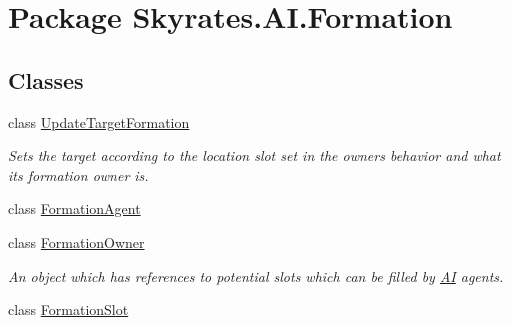 \hypertarget{namespace_skyrates_1_1_a_i_1_1_formation}{\section{Package Skyrates.\-A\-I.\-Formation}
\label{namespace_skyrates_1_1_a_i_1_1_formation}
}
\subsection*{Classes}
\begin{DoxyCompactItemize}
\item 
class \hyperlink{class_skyrates_1_1_a_i_1_1_formation_1_1_update_target_formation}{Update\-Target\-Formation}
\begin{DoxyCompactList}\small\item\em Sets the target according to the location slot set in the owners behavior and what its formation owner is. \end{DoxyCompactList}\item 
class \hyperlink{class_skyrates_1_1_a_i_1_1_formation_1_1_formation_agent}{Formation\-Agent}
\item 
class \hyperlink{class_skyrates_1_1_a_i_1_1_formation_1_1_formation_owner}{Formation\-Owner}
\begin{DoxyCompactList}\small\item\em An object which has references to potential slots which can be filled by \hyperlink{namespace_skyrates_1_1_a_i}{A\-I} agents. \end{DoxyCompactList}\item 
class \hyperlink{class_skyrates_1_1_a_i_1_1_formation_1_1_formation_slot}{Formation\-Slot}
\end{DoxyCompactItemize}
